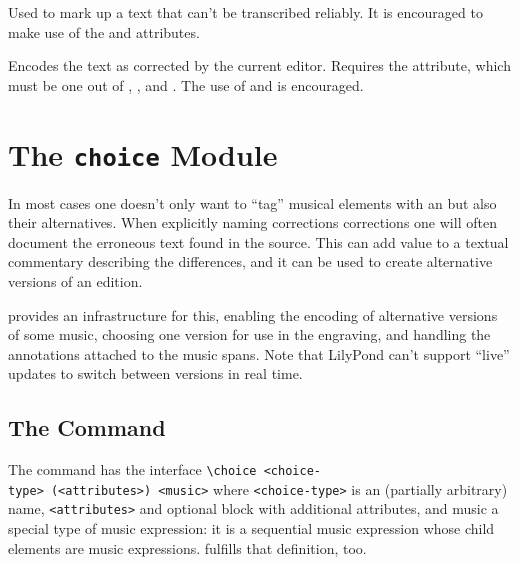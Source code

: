 \documentclass[]{ollmanual}
\begin{document}

Used to mark up a text that can't be transcribed reliably. It is
encouraged to make use of the  and
 attributes.


Encodes the text as corrected by the current editor. Requires the
 attribute, which must be one out of ,
, and . The use of
 and  is encouraged.

\hypertarget{the-choice-module}{%
\section{\texorpdfstring{The \texttt{choice}
Module}{The choice Module}}\label{the-choice-module}}

In most cases one doesn't only want to ``tag'' musical elements with an
 but also their alternatives. When explicitly
naming corrections corrections one will often document the erroneous
text found in the source. This can add value to a textual commentary
describing the differences, and it can be used to create alternative
versions of an edition.

 provides an infrastructure for this, enabling the encoding
of alternative versions of some music, choosing one version for use in
the engraving, and handling the annotations attached to the music spans.
Note that LilyPond can't support ``live'' updates to switch between
versions in real time.

\hypertarget{the-command-1}{%
\subsection{\texorpdfstring{The 
Command}{The  Command}}\label{the-command-1}}

The  command has the interface
\texttt{\textbackslash{}choice\ \textless{}choice-type\textgreater{}\ (\textless{}attributes\textgreater{})\ \textless{}music\textgreater{}}
where \texttt{\textless{}choice-type\textgreater{}} is an (partially
arbitrary) name, \texttt{\textless{}attributes\textgreater{}} and
optional  block with additional attributes, and music a
special type of music expression: it is a sequential music expression
whose child elements are  music expressions.
 fulfills that definition, too.
\end{document}

